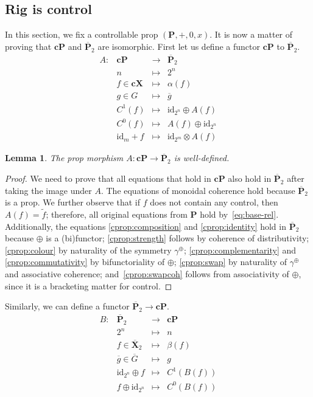 \documentclass[a4paper]{article}
\theoremstyle{plain}
\newtheorem{lemma}[theorem]{Lemma}
\theoremstyle{definition}
\newcommand{\cat}[1]{\mathbf{#1}}
\newcommand{\ccat}[1]{\mathbf{c #1}}
\newcommand{\scat}[1]{\mathbf{\ovl{#1}}}
\newcommand{\tcat}[1]{\mathbf{\ovl{#1}}_2}
\newcommand{\symplus}{\gamma^\oplus}
\newcommand{\iid}{\mathrm{id}}
\newcommand{\ovl}[1]{\overline{#1}}
\begin{document}
\subsection{Rig is control}
\label{sec:finale}

In this section, we fix a controllable prop $(\cat P, +, 0, x)$. It is now
a matter of proving that $\ccat P$ and $\scat P_2$ are isomorphic. First let
us define a functor $\ccat P$ to $\scat P_2$.
\[
	\begin{array}{lrcl}
		A \colon & \ccat P & \to & \scat P_2 \\
		& n & \mapsto & 2^n \\
		& f \in \ccat X & \mapsto & \alpha(f) \\
		& g \in G & \mapsto & \ovl g \\
		& C^1(f) & \mapsto & \iid_{2^n} \oplus A(f) \\
		& C^0(f) & \mapsto & A(f) \oplus \iid_{2^n} \\
		& \iid_m + f & \mapsto & \iid_{2^m} \otimes A(f)
	\end{array}
\]

\begin{lemma}\label{lem:a-def}
	The prop morphism $A \colon \ccat P \to \tcat P$ is well-defined.
\end{lemma}
\begin{proof}
	We need to prove that all equations that hold in $\ccat P$ also hold in
	$\tcat P$ after taking the image under $A$. The equations of monoidal
	coherence hold because $\tcat P$ is a prop. We further observe that if $f$
	does not contain any control, then $A(f) = \widetilde f$; therefore, all
 original equations from $\cat P$ hold by~\eqref{eq:base-rel}.
	Additionally, the equations \ref{cprop:composition} and
	\ref{cprop:identity} hold in $\tcat P$ because $\oplus$ is a
	(bi)functor; \ref{cprop:strength} follows by coherence of distributivity;
	\ref{cprop:colour} by naturality of the symmetry $\symplus$;
	\ref{cprop:complementarity} and \ref{cprop:commutativity} by
	bifunctoriality of $\oplus$; \ref{cprop:swap} by naturality of $\symplus$
	and associative coherence; and~\ref{cprop:swapcoh} follows from
	associativity of $\oplus$, since it is a bracketing matter for control.
\end{proof}

Similarly, we can define a functor $\scat P_2 \to \ccat P$.
\[
	\begin{array}{lrcl}
		B \colon & \scat P_2 & \to & \ccat P \\
		& 2^n & \mapsto & n \\
		& f \in \scat X_2 & \mapsto & \beta(f) \\
		& \ovl g \in \ovl G & \mapsto & g \\
		& \iid_{2^n} \oplus f & \mapsto & C^1(B(f)) \\
		& f \oplus \iid_{2^n} & \mapsto & C^0(B(f))
	\end{array}
\]
\end{document}
